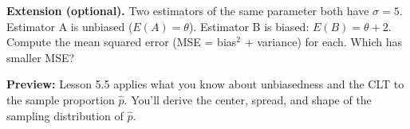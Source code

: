 \documentclass[10pt]{article}
\begin{document}
\begin{extensionbox}
\textbf{Extension (optional).}
Two estimators of the same parameter both have $\sigma = 5$. Estimator A is unbiased
($E(A) = \theta$). Estimator B is biased: $E(B) = \theta + 2$. Compute the mean
squared error (MSE = bias$^2$ + variance) for each. Which has smaller MSE?
\end{extensionbox}

\begin{reflectionbox}
\textbf{Preview:} Lesson 5.5 applies what you know about unbiasedness and the CLT to the
sample proportion $\hat{p}$. You'll derive the center, spread, and shape of the
sampling distribution of $\hat{p}$.
\end{reflectionbox}
\end{document}
